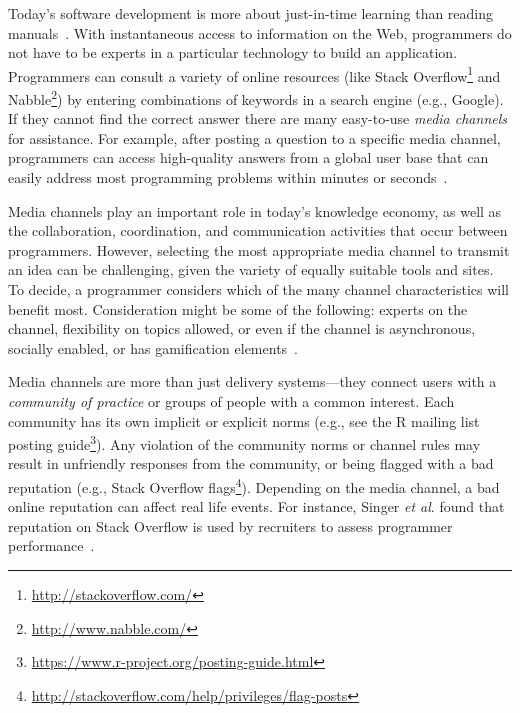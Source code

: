 \documentclass{sig-alternate-05-2015}
\begin{document}
	Today's software development is more about just-in-time learning than reading manuals~\cite{Hartmann2008}.
	With instantaneous access to information on the Web, programmers do not have to be experts in a particular technology to build an application.
	Programmers can consult a variety of online resources (like Stack Overflow\footnote{\url{http://stackoverflow.com/}} and Nabble\footnote{\url{http://www.nabble.com/}}) by entering combinations of keywords in a search engine (e.g., Google).
	If they cannot find the correct answer there are many easy-to-use \textit{media channels} for assistance. For example, after posting a question to a specific media channel, programmers can access high-quality answers from a global user base that can easily address most programming problems within minutes or seconds~\cite{Mamykina2011}.

	Media channels play an important role in today's knowledge economy, as well as the collaboration, coordination, and communication activities that occur between programmers. However, selecting the most appropriate media channel to transmit an idea can be challenging, given the variety of equally suitable tools and sites.
	To decide, a programmer considers which of the many channel characteristics will benefit most. Consideration might be some of the following: experts on the channel, flexibility on topics allowed, or even if the channel is asynchronous, socially enabled, or has gamification elements~\cite{Vasilescu2014c}.

	Media channels are more than just delivery systems---they connect users with a \textit{community of practice} or groups of people with a common interest.
	Each community has its own implicit or explicit norms (e.g., see the R mailing list posting guide\footnote{\url{https://www.r-project.org/posting-guide.html}}).
	Any violation of the community norms or channel rules may result in unfriendly responses from the community, or being flagged with a bad reputation (e.g., Stack Overflow flags\footnote{\url{http://stackoverflow.com/help/privileges/flag-posts}}).
	Depending on the media channel, a bad online reputation can affect real life events.
	For instance, Singer \textit{et al}. found that reputation on Stack Overflow is used by recruiters to assess programmer performance~\cite{Singer2013}.
\end{document}
